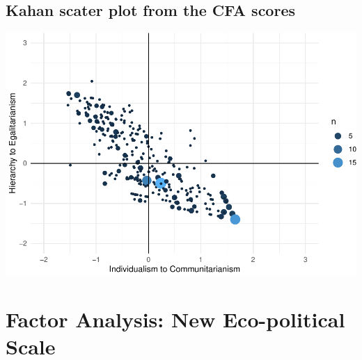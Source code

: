 \documentclass[
]{article}
\begin{document}
\hypertarget{kahan-scater-plot-from-the-cfa-scores}{%
\subsection{Kahan scater plot from the CFA
scores}\label{kahan-scater-plot-from-the-cfa-scores}}

\includegraphics{corstuff_files/figure-latex/unnamed-chunk-18-1.pdf}

\newpage

\hypertarget{factor-analysis-new-eco-political-scale}{%
\section{Factor Analysis: New Eco-political
Scale}\label{factor-analysis-new-eco-political-scale}}
\end{document}
